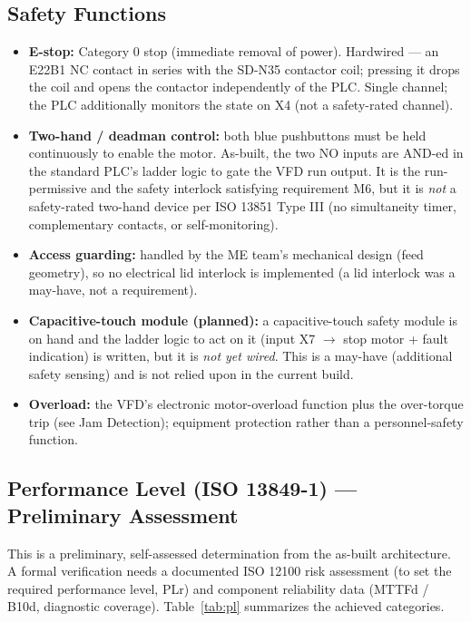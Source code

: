 \documentclass[hidelinks,12pt]{article}
\begin{document}
\subsection{Safety Functions}
\begin{itemize}
    \item \textbf{E-stop:} Category 0 stop (immediate removal of power). Hardwired --- an E22B1 NC contact in series with the SD-N35 contactor coil; pressing it drops the coil and opens the contactor independently of the PLC. Single channel; the PLC additionally monitors the state on X4 (not a safety-rated channel).
    \item \textbf{Two-hand / deadman control:} both blue pushbuttons must be held continuously to enable the motor. As-built, the two NO inputs are AND-ed in the standard PLC's ladder logic to gate the VFD run output. It is the run-permissive and the safety interlock satisfying requirement M6, but it is \emph{not} a safety-rated two-hand device per ISO 13851 Type III (no simultaneity timer, complementary contacts, or self-monitoring).
    \item \textbf{Access guarding:} handled by the ME team's mechanical design (feed geometry), so no electrical lid interlock is implemented (a lid interlock was a may-have, not a requirement).
    \item \textbf{Capacitive-touch module (planned):} a capacitive-touch safety module is on hand and the ladder logic to act on it (input X7 $\rightarrow$ stop motor + fault indication) is written, but it is \emph{not yet wired}. This is a may-have (additional safety sensing) and is not relied upon in the current build.
    \item \textbf{Overload:} the VFD's electronic motor-overload function plus the over-torque trip (see Jam Detection); equipment protection rather than a personnel-safety function.
\end{itemize}

\subsection{Performance Level (ISO 13849-1) --- Preliminary Assessment}
This is a preliminary, self-assessed determination from the as-built architecture. A formal verification needs a documented ISO 12100 risk assessment (to set the required performance level, PLr) and component reliability data (MTTFd / B10d, diagnostic coverage). Table~\ref{tab:pl} summarizes the achieved categories.
\end{document}
